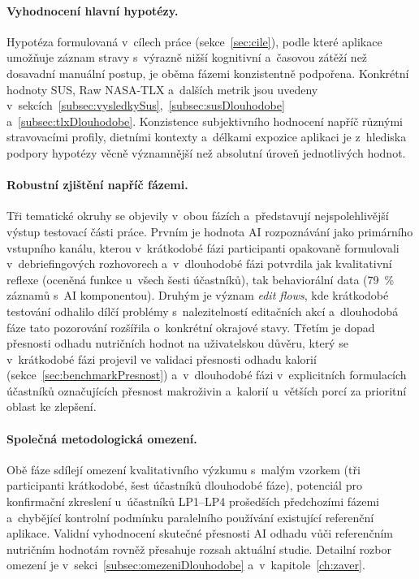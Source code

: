 \paragraph{Vyhodnocení hlavní hypotézy.}
Hypotéza formulovaná v~cílech práce (sekce~\ref{sec:cile}), podle které aplikace umožňuje záznam stravy s~výrazně nižší kognitivní a~časovou zátěží než dosavadní manuální postup, je oběma fázemi konzistentně podpořena.
Konkrétní hodnoty SUS, Raw NASA-TLX a~dalších metrik jsou uvedeny v~sekcích~\ref{subsec:vysledkySus},~\ref{subsec:susDlouhodobe} a~\ref{subsec:tlxDlouhodobe}.
Konzistence subjektivního hodnocení napříč různými stravovacími profily, dietními kontexty a~délkami expozice aplikaci je z~hlediska podpory hypotézy věcně významnější než absolutní úroveň jednotlivých hodnot.

\paragraph{Robustní zjištění napříč fázemi.}
Tři tematické okruhy se objevily v~obou fázích a~představují nejspolehlivější výstup testovací části práce.
Prvním je hodnota AI rozpoznávání jako primárního vstupního kanálu, kterou v~krátkodobé fázi participanti opakovaně formulovali v~debriefingových rozhovorech a~v~dlouhodobé fázi potvrdila jak kvalitativní reflexe (oceněná funkce u~všech šesti účastníků), tak behaviorální data (79~\% záznamů s~AI komponentou).
Druhým je význam \emph{edit flows}, kde krátkodobé testování odhalilo dílčí problémy s~nalezitelností editačních akcí a~dlouhodobá fáze tato pozorování rozšířila o~konkrétní okrajové stavy.
Třetím je dopad přesnosti odhadu nutričních hodnot na uživatelskou důvěru, který se v~krátkodobé fázi projevil ve validaci přesnosti odhadu kalorií (sekce~\ref{sec:benchmarkPresnost}) a~v~dlouhodobé fázi v~explicitních formulacích účastníků označujících přesnost makroživin a~kalorií u~větších porcí za prioritní oblast ke zlepšení.

\paragraph{Společná metodologická omezení.}
Obě fáze sdílejí omezení kvalitativního výzkumu s~malým vzorkem (tři participanti krátkodobé, šest účastníků dlouhodobé fáze), potenciál pro konfirmační zkreslení u~účastníků LP1--LP4 prošedších předchozími fázemi a~chybějící kontrolní podmínku paralelního používání existující referenční aplikace.
Validní vyhodnocení skutečné přesnosti AI odhadu vůči referenčním nutričním hodnotám rovněž přesahuje rozsah aktuální studie.
Detailní rozbor omezení je v~sekci~\ref{subsec:omezeniDlouhodobe} a~v~kapitole~\ref{ch:zaver}.

